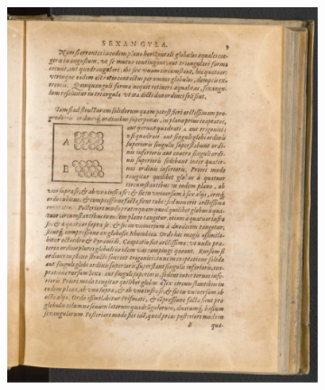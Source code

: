\begin{figure}
    \centering
    \begin{subfigure}{\linewidth}
        \centering
        \includegraphics[width=\linewidth]{Chapters/1_Intro/Images/Kepler_1.pdf}
        \caption{}
        \label{Ch1:Subfig:Kepler_Original_1}
    \end{subfigure}
    \begin{subfigure}{\linewidth}
        \centering

\end{subfigure}
\end{figure}
